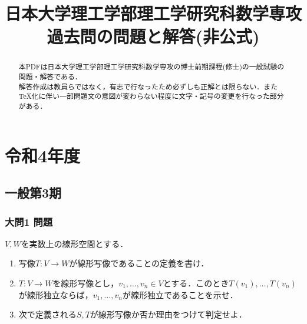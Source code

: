 \documentclass[dvipdfmx]{jsreport}
\title{日本大学理工学部理工学研究科数学専攻 過去問の問題と解答(非公式)}
\author{}
\date{} %
\begin{document}
\maketitle %

\begin{abstract} %
	本PDFは日本大学理工学部理工学研究科数学専攻の博士前期課程(修士)の一般試験の問題・解答である．\\
	解答作成は教員らではなく，有志で行なったため必ずしも正解とは限らない．また\TeX 化に伴い一部問題文の意図が変わらない程度に文字・記号の変更を行なった部分がある．
\end{abstract}

\tableofcontents %



\part{令和4年度}
\chapter{一般第3期}
\section{大問1 問題}
\begin{tcolorbox} %
	$V, W$を実数上の線形空間とする．
\begin{enumerate}
	\item 写像$T\colon V\to W$が線形写像であることの定義を書け．
	\item $T\colon V\to W$を線形写像とし，$v_1, \ldots, v_n\in V$とする．このとき$T(v_1), \ldots, T(v_n)$が線形独立ならば，$v_1, \ldots, v_n$が線形独立であることを示せ．
	\item 次で定義される$S, T$が線形写像か否か理由をつけて判定せよ．
\end{enumerate}
\end{tcolorbox}
\end{document}
